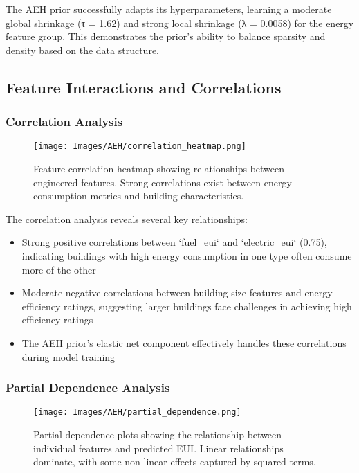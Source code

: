 The AEH prior successfully adapts its hyperparameters, learning a moderate global shrinkage (τ = 1.62) and strong local shrinkage (λ = 0.0058) for the energy feature group. This demonstrates the prior's ability to balance sparsity and density based on the data structure.

\subsection{Feature Interactions and Correlations}

\subsubsection{Correlation Analysis}

\begin{figure}[ht]
    \centering
    \texttt{[image: Images/AEH/correlation\_heatmap.png]}
    \caption{Feature correlation heatmap showing relationships between engineered features. Strong correlations exist between energy consumption metrics and building characteristics.}
    \label{fig:correlation_heatmap}
\end{figure}

The correlation analysis reveals several key relationships:
\begin{itemize}
    \item Strong positive correlations between `fuel\_eui` and `electric\_eui` (0.75), indicating buildings with high energy consumption in one type often consume more of the other
    \item Moderate negative correlations between building size features and energy efficiency ratings, suggesting larger buildings face challenges in achieving high efficiency ratings
    \item The AEH prior's elastic net component effectively handles these correlations during model training
\end{itemize}

\subsubsection{Partial Dependence Analysis}

\begin{figure}[ht]
    \centering
    \texttt{[image: Images/AEH/partial\_dependence.png]}
    \caption{Partial dependence plots showing the relationship between individual features and predicted EUI. Linear relationships dominate, with some non-linear effects captured by squared terms.}
    \label{fig:partial_dependence}
\end{figure}

